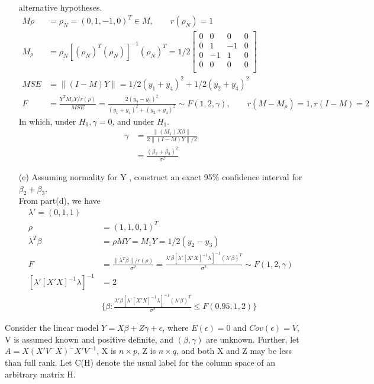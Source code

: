 \documentclass{article}
\begin{document}
\begin{itemize}
alternative hypotheses.\\
\begin{align*}
    M\rho &=  \rho_N= (0, 1, -1, 0)^T \in M, \qquad r(\rho_N) = 1\\
    M_{\rho} &= \rho_N [(\rho_N)^T (\rho_N)]^{-1} (\rho_N)^T=1/2 \begin{bmatrix}
           0  & 0 & 0 & 0  \\
           0 &  1 & -1 & 0\\
           0  & -1 & 1 & 0 \\
           0 & 0 & 0 & 0\\
         \end{bmatrix}\\
    MSE &= \lVert (I-M)Y \rVert = 1/2 (y_1+y_4)^2 + 1/2 (y_2 + y_4)^2 \\
    F &= \frac{Y^T M_{\rho} Y/r(\rho)}{MSE} = \frac{2(y_2 - y_3)^2}{(y_1+y_4)^2 + (y_2 + y_4)^2} \sim F(1,2, \gamma), \qquad r(M-M_{\rho}) = 1, r(I-M) = 2
\end{align*} 
In which, under $H_0, \gamma = 0$, and under $H_1$.
\begin{align*}
    \gamma &= \frac{\lVert (M_1) X\beta \rVert}{2 \lVert (I-M)Y \rVert/2}\\
    &= \frac{(\beta_2 + \beta_3)^2}{\sigma^2}
\end{align*} 
\item[(e)] Assuming normality for Y , construct an exact 95$\%$ confidence interval for $\beta_2 + \beta_3$.\\
From part(d), we have
\begin{align*}
 \lambda' = (0, 1, 1)\\
 \rho &= (1, 1, 0, 1)^T\\
 \lambda^T \beta &=  \rho M Y = M_1 Y= 1/2 (y_2 - y_3)\\
  F &= \frac{\lVert \lambda^T \beta \rVert/r(\rho)}{\sigma^2} = \frac{\lambda'\beta [\lambda'[X'X]^{-1} \lambda]^{-1} (\lambda'\beta)^T }{\sigma^2} \sim F(1,2, \gamma)\\
  [\lambda'[X'X]^{-1} \lambda]^{-1} & = 2\\
 &\{\beta: \frac{\lambda'\beta [\lambda'[X'X]^{-1} \lambda]^{-1} (\lambda'\beta)^T }{\sigma^2} \leq F(0.95, 1,2) \} 
\end{align*} 

\end{itemize}
\exercise
Consider the linear model $Y = X\beta + Z\gamma + \epsilon$, where $E(\epsilon) = 0$ and $Cov(\epsilon) = V$, V is assumed known and positive definite, and $(\beta, \gamma)$ are unknown. Further, let $A =X(X'V^-X)^-X'V^{-1}$, X is $n \times p$, Z is $n \times q$, and both X and Z may be less than full rank. Let C(H) denote the usual label for the column space of an arbitrary matrix H.
\end{document}
